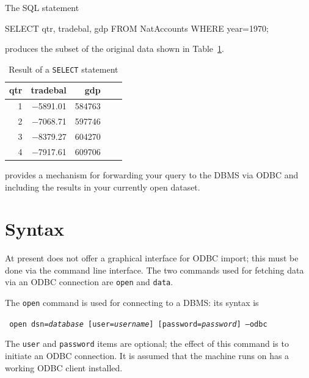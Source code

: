 The SQL statement
\begin{code}
  SELECT qtr, tradebal, gdp FROM NatAccounts WHERE year=1970;
\end{code}
produces the subset of the original data shown in Table~\ref{tab:odbc-result}.

\begin{table}[htbp]
  \centering
  \begin{tabular}{rrrrr}
    \hline
    qtr	& tradebal & gdp    \\ 
    \hline
    1	& $-$5891.01 & 584763 \\ 
    2	& $-$7068.71 & 597746 \\ 
    3	& $-$8379.27 & 604270 \\ 
    4	& $-$7917.61 & 609706  
  \end{tabular}
  \caption{Result of a \texttt{SELECT} statement}
  \label{tab:odbc-result}
\end{table}

 provides a mechanism for forwarding your query to the DBMS
via ODBC and including the results in your currently open dataset.

\section{Syntax}
\label{sec:odbc-syntax}

At present  does not offer a graphical interface for ODBC
import; this must be done via the command line interface. The two
commands used for fetching data via an ODBC connection are
\texttt{open} and \texttt{data}.

The \texttt{open} command is used for connecting to a DBMS: its syntax
is
\begin{flushleft}
\texttt{%
  open dsn=\emph{database} [user=\emph{username}]
  [password=\emph{password}] --odbc
}
\end{flushleft}
The \texttt{user} and \texttt{password} items are optional; the effect
of this command is to initiate an ODBC connection. It is assumed that
the machine  runs on has a working ODBC client installed.

